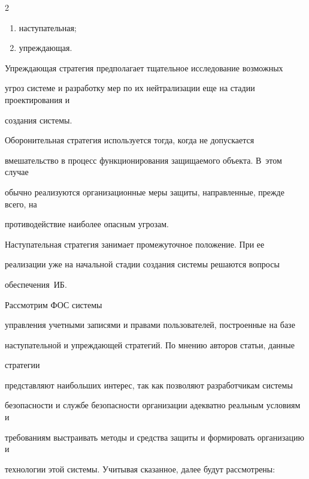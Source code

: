 \begin{multicols}{2}
\begin{enumerate}[(1)]
\item наступательная;


\item упреждающая.


\end{enumerate}





       Упреждающая стратегия предполагает тщательное исследование возможных 


угроз сис\-те\-ме и разработку мер по их нейтрализации еще на стадии проектирования и 


создания сис\-темы.


       


       Оборонительная стратегия используется тогда, когда не допускается 


вмешательство в процесс функционирования защищаемого объекта. В~этом случае 


обычно реализуются организационные меры защиты, направленные, прежде всего, на 


противодействие наиболее опасным угрозам.


       


       Наступательная стратегия занимает промежуточное положение. При ее 


реализации уже на начальной стадии создания сис\-те\-мы решаются вопросы 


обеспечения~ИБ. 


       


       Рассмотрим ФОС сис\-те\-мы 


       управ\-ле\-ния учетными записями и правами пользователей, построенные на базе 


наступательной и упреждающей стратегий. По мнению авторов статьи, данные\linebreak


 страте\-гии 


представляют наибольших интерес, так как позволяют разработчикам сис\-те\-мы 


безопас\-ности и службе безопас\-ности организации адекватно реальным условиям и 


требованиям выстраивать методы и средства защиты и формировать организацию и 


технологии этой сис\-те\-мы. Учитывая сказанное, далее будут рассмотрены:



\end{multicols}
